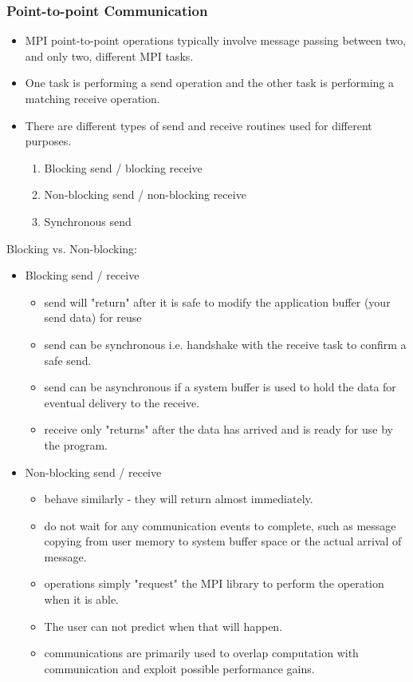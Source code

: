 \documentclass[10pt,t]{beamer}
\begin{document}
\begin{frame}
  \frametitle{Point-to-point Communication}
  \begin{itemize}
  \item MPI point-to-point operations typically involve message passing between two, and only two, different MPI tasks. 
  \item One task is performing a send operation and the other task is performing a matching receive operation.
  \item There are different types of send and receive routines used for different purposes.
    \begin{enumerate}
    \item Blocking send / blocking receive
    \item Non-blocking send / non-blocking receive
    \item Synchronous send
    \end{enumerate}
  \end{itemize}

  \framebreak

  \begin{block}{Blocking vs. Non-blocking:}
    \begin{itemize}
    \item Blocking send / receive 
      \begin{itemize}
      \item send will "return" after it is safe to modify the application buffer (your send data) for reuse
      \item send can be synchronous i.e. handshake with the receive task to confirm a safe send.
      \item send can be asynchronous if a system buffer is used to hold the data for eventual delivery to the receive.
      \item receive only "returns" after the data has arrived and is ready for use by the program.
      \end{itemize}
    \item Non-blocking send / receive
      \begin{itemize}
      \item behave similarly - they will return almost immediately. 
      \item do not wait for any communication events to complete, such as message copying from user memory to system buffer space or the actual arrival of message.
      \item operations simply "request" the MPI library to perform the operation when it is able. 
      \item[] The user can not predict when that will happen.
      \item communications are primarily used to overlap computation with communication and exploit possible performance gains.
      \end{itemize}
    \end{itemize}
  \end{block}


\end{frame}
\end{document}
